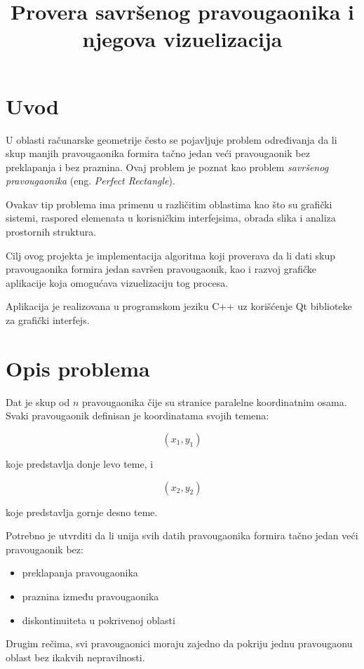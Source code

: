 \documentclass[11pt,a4paper]{article}
\title{Provera savršenog pravougaonika i njegova vizuelizacija}
\author{}
\date{}
\begin{document}
\maketitle

\section{Uvod}

U oblasti računarske geometrije često se pojavljuje problem određivanja da li skup manjih pravougaonika formira tačno jedan veći pravougaonik bez preklapanja i bez praznina. 
Ovaj problem je poznat kao problem \textit{savršenog pravougaonika} (eng. \textit{Perfect Rectangle}).

Ovakav tip problema ima primenu u različitim oblastima kao što su grafički sistemi, raspored elemenata u korisničkim interfejsima, obrada slika i analiza prostornih struktura.

Cilj ovog projekta je implementacija algoritma koji proverava da li dati skup pravougaonika formira jedan savršen pravougaonik, kao i razvoj grafičke aplikacije koja omogućava vizuelizaciju tog procesa.

Aplikacija je realizovana u programskom jeziku C++ uz korišćenje Qt biblioteke za grafički interfejs.

\section{Opis problema}

Dat je skup od $n$ pravougaonika čije su stranice paralelne koordinatnim osama. 
Svaki pravougaonik definisan je koordinatama svojih temena:

\[
(x_1, y_1)
\]

koje predstavlja donje levo teme, i

\[
(x_2, y_2)
\]

koje predstavlja gornje desno teme.

Potrebno je utvrditi da li unija svih datih pravougaonika formira tačno jedan veći pravougaonik bez:

\begin{itemize}
\item preklapanja pravougaonika
\item praznina između pravougaonika
\item diskontinuiteta u pokrivenoj oblasti
\end{itemize}

Drugim rečima, svi pravougaonici moraju zajedno da pokriju jednu pravougaonu oblast bez ikakvih nepravilnosti.
\end{document}
